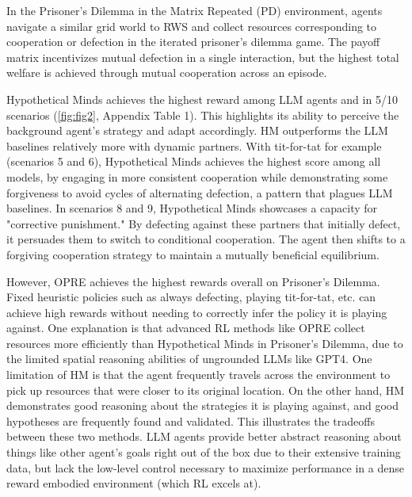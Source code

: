 \documentclass{article} %
\begin{document}
In the Prisoner's Dilemma in the Matrix Repeated (PD) environment, agents navigate a similar grid world to RWS and collect resources corresponding to cooperation or defection in the iterated prisoner's dilemma game. The payoff matrix incentivizes mutual defection in a single interaction, but the highest total welfare is achieved through mutual cooperation across an episode.

Hypothetical Minds achieves the highest reward among LLM agents and in 5/10 scenarios (\autoref{fig:fig2}, Appendix Table 1). This highlights its ability to perceive the background agent's strategy and adapt accordingly. HM outperforms the LLM baselines relatively more with dynamic partners. With tit-for-tat for example (scenarios 5 and 6), Hypothetical Minds achieves the highest score among all models, by engaging in more consistent cooperation while demonstrating some forgiveness to avoid cycles of alternating defection, a pattern that plagues LLM baselines. In scenarios 8 and 9, Hypothetical Minds showcases a capacity for "corrective punishment." By defecting against these partners that initially defect, it persuades them to switch to conditional cooperation. The agent then shifts to a forgiving cooperation strategy to maintain a mutually beneficial equilibrium.

However, OPRE achieves the highest rewards overall on Prisoner’s Dilemma. Fixed heuristic policies such as always defecting, playing tit-for-tat, etc. can achieve high rewards without needing to correctly infer the policy it is playing against. One explanation is that advanced RL methods like OPRE collect resources more efficiently than Hypothetical Minds in Prisoner’s Dilemma, due to the limited spatial reasoning abilities of ungrounded LLMs like GPT4. One limitation of HM is that the agent frequently travels across the environment to pick up resources that were closer to its original location. On the other hand, HM demonstrates good reasoning about the strategies it is playing against, and good hypotheses are frequently found and validated. This illustrates the tradeoffs between these two methods. LLM agents provide better abstract reasoning about things like other agent’s goals right out of the box due to their extensive training data, but lack the low-level control necessary to maximize performance in a dense reward embodied environment (which RL excels at).

\end{document}
